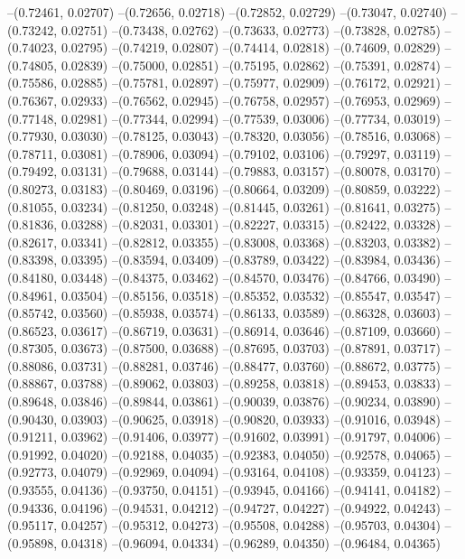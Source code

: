 --(0.72461, 0.02707)
--(0.72656, 0.02718)
--(0.72852, 0.02729)
--(0.73047, 0.02740)
--(0.73242, 0.02751)
--(0.73438, 0.02762)
--(0.73633, 0.02773)
--(0.73828, 0.02785)
--(0.74023, 0.02795)
--(0.74219, 0.02807)
--(0.74414, 0.02818)
--(0.74609, 0.02829)
--(0.74805, 0.02839)
--(0.75000, 0.02851)
--(0.75195, 0.02862)
--(0.75391, 0.02874)
--(0.75586, 0.02885)
--(0.75781, 0.02897)
--(0.75977, 0.02909)
--(0.76172, 0.02921)
--(0.76367, 0.02933)
--(0.76562, 0.02945)
--(0.76758, 0.02957)
--(0.76953, 0.02969)
--(0.77148, 0.02981)
--(0.77344, 0.02994)
--(0.77539, 0.03006)
--(0.77734, 0.03019)
--(0.77930, 0.03030)
--(0.78125, 0.03043)
--(0.78320, 0.03056)
--(0.78516, 0.03068)
--(0.78711, 0.03081)
--(0.78906, 0.03094)
--(0.79102, 0.03106)
--(0.79297, 0.03119)
--(0.79492, 0.03131)
--(0.79688, 0.03144)
--(0.79883, 0.03157)
--(0.80078, 0.03170)
--(0.80273, 0.03183)
--(0.80469, 0.03196)
--(0.80664, 0.03209)
--(0.80859, 0.03222)
--(0.81055, 0.03234)
--(0.81250, 0.03248)
--(0.81445, 0.03261)
--(0.81641, 0.03275)
--(0.81836, 0.03288)
--(0.82031, 0.03301)
--(0.82227, 0.03315)
--(0.82422, 0.03328)
--(0.82617, 0.03341)
--(0.82812, 0.03355)
--(0.83008, 0.03368)
--(0.83203, 0.03382)
--(0.83398, 0.03395)
--(0.83594, 0.03409)
--(0.83789, 0.03422)
--(0.83984, 0.03436)
--(0.84180, 0.03448)
--(0.84375, 0.03462)
--(0.84570, 0.03476)
--(0.84766, 0.03490)
--(0.84961, 0.03504)
--(0.85156, 0.03518)
--(0.85352, 0.03532)
--(0.85547, 0.03547)
--(0.85742, 0.03560)
--(0.85938, 0.03574)
--(0.86133, 0.03589)
--(0.86328, 0.03603)
--(0.86523, 0.03617)
--(0.86719, 0.03631)
--(0.86914, 0.03646)
--(0.87109, 0.03660)
--(0.87305, 0.03673)
--(0.87500, 0.03688)
--(0.87695, 0.03703)
--(0.87891, 0.03717)
--(0.88086, 0.03731)
--(0.88281, 0.03746)
--(0.88477, 0.03760)
--(0.88672, 0.03775)
--(0.88867, 0.03788)
--(0.89062, 0.03803)
--(0.89258, 0.03818)
--(0.89453, 0.03833)
--(0.89648, 0.03846)
--(0.89844, 0.03861)
--(0.90039, 0.03876)
--(0.90234, 0.03890)
--(0.90430, 0.03903)
--(0.90625, 0.03918)
--(0.90820, 0.03933)
--(0.91016, 0.03948)
--(0.91211, 0.03962)
--(0.91406, 0.03977)
--(0.91602, 0.03991)
--(0.91797, 0.04006)
--(0.91992, 0.04020)
--(0.92188, 0.04035)
--(0.92383, 0.04050)
--(0.92578, 0.04065)
--(0.92773, 0.04079)
--(0.92969, 0.04094)
--(0.93164, 0.04108)
--(0.93359, 0.04123)
--(0.93555, 0.04136)
--(0.93750, 0.04151)
--(0.93945, 0.04166)
--(0.94141, 0.04182)
--(0.94336, 0.04196)
--(0.94531, 0.04212)
--(0.94727, 0.04227)
--(0.94922, 0.04243)
--(0.95117, 0.04257)
--(0.95312, 0.04273)
--(0.95508, 0.04288)
--(0.95703, 0.04304)
--(0.95898, 0.04318)
--(0.96094, 0.04334)
--(0.96289, 0.04350)
--(0.96484, 0.04365)
